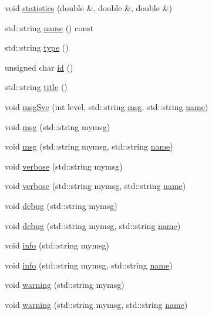 \begin{DoxyCompactItemize}
\item 
void \hyperlink{classHisto1D_acc0d6f2080b0cfafc85ebc49cf0efc31}{statistics} (double \&, double \&, double \&)
\item 
std\+::string \hyperlink{classObject_a300f4c05dd468c7bb8b3c968868443c1}{name} () const
\item 
std\+::string \hyperlink{classObject_a84f99f70f144a83e1582d1d0f84e4e62}{type} ()
\item 
unsigned char \hyperlink{classObject_af99145335cc61ff6e2798ea17db009d2}{id} ()
\item 
std\+::string \hyperlink{classObject_a73a0f1a41828fdd8303dd662446fb6c3}{title} ()
\item 
void \hyperlink{classObject_a3f9d5537ebce0c0f2bf6ae4d92426f3c}{msg\+Svc} (int level, std\+::string \hyperlink{classObject_a58b2d0618c2d08cf2383012611528d97}{msg}, std\+::string \hyperlink{classObject_a300f4c05dd468c7bb8b3c968868443c1}{name})
\item 
void \hyperlink{classObject_a58b2d0618c2d08cf2383012611528d97}{msg} (std\+::string mymsg)
\item 
void \hyperlink{classObject_ac5d59299273cee27aacf7de00d2e7034}{msg} (std\+::string mymsg, std\+::string \hyperlink{classObject_a300f4c05dd468c7bb8b3c968868443c1}{name})
\item 
void \hyperlink{classObject_a83d2db2df682907ea1115ad721c1c4a1}{verbose} (std\+::string mymsg)
\item 
void \hyperlink{classObject_a2d4120195317e2a3c6532e8bb9f3da68}{verbose} (std\+::string mymsg, std\+::string \hyperlink{classObject_a300f4c05dd468c7bb8b3c968868443c1}{name})
\item 
void \hyperlink{classObject_aac010553f022165573714b7014a15f0d}{debug} (std\+::string mymsg)
\item 
void \hyperlink{classObject_a6c9a0397ca804e04d675ed05683f5420}{debug} (std\+::string mymsg, std\+::string \hyperlink{classObject_a300f4c05dd468c7bb8b3c968868443c1}{name})
\item 
void \hyperlink{classObject_a644fd329ea4cb85f54fa6846484b84a8}{info} (std\+::string mymsg)
\item 
void \hyperlink{classObject_a1ca123253dfd30fc28b156f521dcbdae}{info} (std\+::string mymsg, std\+::string \hyperlink{classObject_a300f4c05dd468c7bb8b3c968868443c1}{name})
\item 
void \hyperlink{classObject_a65cd4fda577711660821fd2cd5a3b4c9}{warning} (std\+::string mymsg)
\item 
void \hyperlink{classObject_a11f101db4dd73d9391b0231818881d86}{warning} (std\+::string mymsg, std\+::string \hyperlink{classObject_a300f4c05dd468c7bb8b3c968868443c1}{name})

\end{DoxyCompactItemize}
